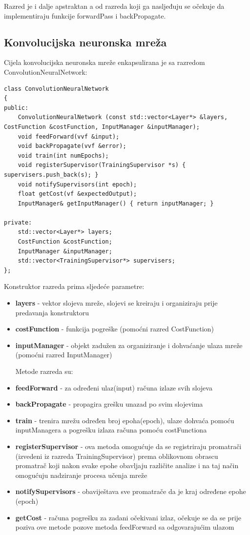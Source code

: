 \documentclass[times, utf8, zavrsni, numeric]{fer}
\begin{document}
Razred je i dalje apstraktan a od razreda koji ga nasljeđuju se očekuje da implementiraju funkcije forwardPass i backPropagate.

\subsection{Konvolucijska neuronska mreža}
Cijela konvolucijska neuronska mreže enkapsulirana je sa razredom ConvolutionNeuralNetwork:
\begin{lstlisting}[caption=Razred ConvolutionNeuralNetwork,
  label=CNN]
class ConvolutionNeuralNetwork
{
public:
    ConvolutionNeuralNetwork (const std::vector<Layer*> &layers, CostFunction &costFunction, InputManager &inputManager);
    void feedForward(vvf &input);
    void backPropagate(vvf &error);
    void train(int numEpochs);
    void registerSupervisor(TrainingSupervisor *s) { supervisers.push_back(s); }
    void notifySupervisors(int epoch);
    float getCost(vf &expectedOutput);
    InputManager& getInputManager() { return inputManager; }
    
private:
    std::vector<Layer*> layers;
    CostFunction &costFunction;
    InputManager &inputManager;
    std::vector<TrainingSupervisor*> supervisers;
};
\end{lstlisting}

Konstruktor razreda prima sljedeće parametre:
\begin{itemize}
\item \textbf{layers} - vektor slojeva mreže, slojevi se kreiraju i organiziraju prije predavanja konstruktoru
\item \textbf{costFunction} - funkcija pogreške (pomoćni razred CostFunction)
\item \textbf{inputManager} - objekt zadužen za organiziranje i dohvaćanje ulaza mreže (pomoćni razred InputManager)

Metode razreda su:
\item \textbf{feedForward} - za određeni ulaz(input) računa izlaze svih slojeva
\item \textbf{backPropagate} - propagira grešku unazad po svim slojevima
\item \textbf{train} - trenira mrežu određen broj epoha(epoch), ulaze dohvaća pomoću inputManagera a pogrešku izlaza računa pomoću costFunctiona
\item \textbf{registerSupervisor} - ova metoda omogućuje da se registriraju promatrači (izvedeni iz razreda TrainingSupervisor) prema oblikovnom obrascu promatrač koji nakon svake epohe obavljaju različite analize i na taj način omogućuju nadziranje procesa učenja mreže
\item \textbf{notifySupervisors} - obaviještava sve promatrače da je kraj određene epohe (epoch)
\item \textbf{getCost} - računa pogrešku za zadani očekivani izlaz, očekuje se da se prije poziva ove metode pozove metoda feedForward sa odgovarajućim ulazom
\end{itemize}
\end{document}
